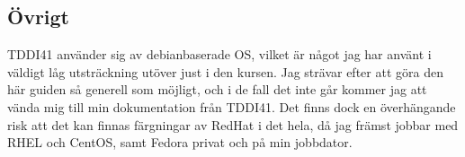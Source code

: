 \subsection{Övrigt}
TDDI41 använder sig av debianbaserade OS, vilket är något jag har använt i väldigt låg utsträckning utöver just i den kursen. Jag strävar efter att göra den här guiden så generell som möjligt, och i de fall det inte går
kommer jag att vända mig till min dokumentation från TDDI41. Det finns dock en överhängande risk att det kan finnas färgningar av RedHat i det hela, då jag främst jobbar med RHEL och CentOS, samt Fedora privat och på min jobbdator.

